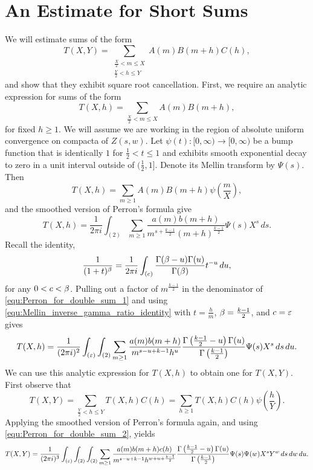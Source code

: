 \documentclass[12pt,reqno,oneside]{amsart}
\begin{document}
\section*{An Estimate for Short Sums}
  We will estimate sums of the form
  \[
    T(X,Y) = \sum_{\substack{\frac{X}{2} < m \le X \\ \frac{Y}{2} < h \le Y}}A(m)B(m+h)C(h),
  \]
  and show that they exhibit square root cancellation. First, we require an analytic expression for sums of the form
  \[
    T(X,h) = \sum_{\frac{X}{2} < m \le X}A(m)B(m+h),
  \]
  for fixed $h \ge 1$. We will assume we are working in the region of absolute uniform convergence on compacta of $Z(s,w)$. Let $\psi(t):[0,\infty) \to [0,\infty)$ be a bump function that is identically $1$ for $\frac{1}{2} < t \le 1$ and exhibits smooth exponential decay to zero in a unit interval outside of $\big(\frac{1}{2},1\big]$. Denote its Mellin transform by $\Psi(s)$. Then
  \[
    T(X,h) = \sum_{m \ge 1}A(m)B(m+h)\psi\left(\frac{m}{X}\right),
  \]
  and the smoothed version of Perron's formula give
  \begin{equation}\label{equ:Perron_for_double_sum_1}
    T(X,h) = \frac{1}{2\pi i}\int_{(2)}\sum_{m \ge 1}\frac{a(m)b(m+h)}{m^{s+\frac{k-1}{2}}(m+h)^{\frac{k-1}{2}}}\Psi(s)X^{s}\,ds.
  \end{equation}
  Recall the identity,
  \begin{equation}\label{equ:Mellin_inverse_gamma_ratio_identity}
    \frac{1}{(1+t)^{\beta}} = \frac{1}{2\pi i}\int_{(c)}\frac{\Gamma(\beta-u)\Gamma(u)}{\Gamma(\beta)}t^{-u}\,du,
  \end{equation}
  for any $0 < c < \beta$. Pulling out a factor of $m^{\frac{k-1}{2}}$ in the denominator of \cref{equ:Perron_for_double_sum_1} and using \cref{equ:Mellin_inverse_gamma_ratio_identity} with $t = \frac{h}{m}$, $\beta = \frac{k-1}{2}$, and $c = \varepsilon$ gives
  \begin{equation}\label{equ:Perron_for_double_sum_2}
    T(X,h) = \frac{1}{(2\pi i)^{2}}\int_{(\varepsilon)}\int_{(2)}\sum_{m \ge 1}\frac{a(m)b(m+h)}{m^{s-u+k-1}h^{u}}\frac{\Gamma\left(\frac{k-1}{2}-u\right)\Gamma(u)}{\Gamma\left(\frac{k-1}{2}\right)}\Psi(s)X^{s}\,ds\,du.
  \end{equation}
  We can use this analytic expression for $T(X,h)$ to obtain one for $T(X,Y)$. First observe that
  \[
    T(X,Y) = \sum_{\frac{Y}{2} < h \le Y}T(X,h)C(h) = \sum_{h \ge 1}T(X,h)C(h)\psi\left(\frac{h}{Y}\right).
  \]
  Applying the smoothed version of Perron's formula again, and using \cref{equ:Perron_for_double_sum_2}, yields
  \begin{equation}\label{equ:Perron_for_triple_sum_1}
    T(X,Y) = \frac{1}{(2\pi i)^{3}}\int_{(\varepsilon)}\int_{(2)}\int_{(2)}\sum_{m \ge 1}\frac{a(m)b(m+h)c(h)}{m^{s-u+k-1}h^{w+u+\frac{k-1}{2}}}\frac{\Gamma\left(\frac{k-1}{2}-u\right)\Gamma(u)}{\Gamma\left(\frac{k-1}{2}\right)}\Psi(s)\Psi(w)X^{s}Y^{w}\,ds\,dw\,du.
  \end{equation}
\end{document}
